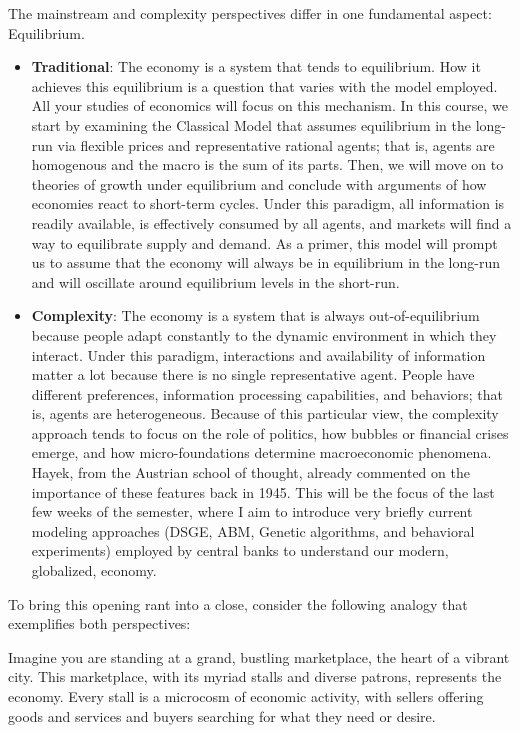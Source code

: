 \documentclass[10pt]{article}
\begin{document}
The mainstream and complexity perspectives differ in one fundamental aspect: Equilibrium.

\begin{itemize}
  \item \textbf{Traditional}: The economy is a system that tends to equilibrium. How it achieves this equilibrium is a question that varies with the model employed. All your studies of economics will focus on this mechanism. In this course, we start by examining the Classical Model that assumes equilibrium in the long-run via flexible prices and representative rational agents; that is, agents are homogenous and the macro is the sum of its parts. Then, we will move on to theories of growth under equilibrium and conclude with arguments of how economies react to short-term cycles. Under this paradigm, all information is readily available, is effectively consumed by all agents, and markets will find a way to equilibrate supply and demand. As a primer, this model will prompt us to assume that the economy will always be in equilibrium in the long-run and will oscillate around equilibrium levels in the short-run.
  \item \textbf{Complexity}: The economy is a system that is always out-of-equilibrium because people adapt constantly to the dynamic environment in which they interact. Under this paradigm, interactions and availability of information matter a lot because there is no single representative agent. People have different preferences, information processing capabilities, and behaviors; that is, agents are heterogeneous. Because of this particular view, the complexity approach tends to focus on the role of politics, how bubbles or financial crises emerge, and how micro-foundations determine macroeconomic phenomena. Hayek, from the Austrian school of thought, already commented on the importance of these features back in 1945. This will be the focus of the last few weeks of the semester, where I aim to introduce very briefly current modeling approaches (DSGE, ABM, Genetic algorithms, and behavioral experiments) employed by central banks to understand our modern, globalized, economy.
\end{itemize}

To bring this opening rant into a close, consider the following analogy that exemplifies both perspectives:

Imagine you are standing at a grand, bustling marketplace, the heart of a vibrant city. This marketplace, with its myriad stalls and diverse patrons, represents the economy. Every stall is a microcosm of economic activity, with sellers offering goods and services and buyers searching for what they need or desire.
\end{document}
